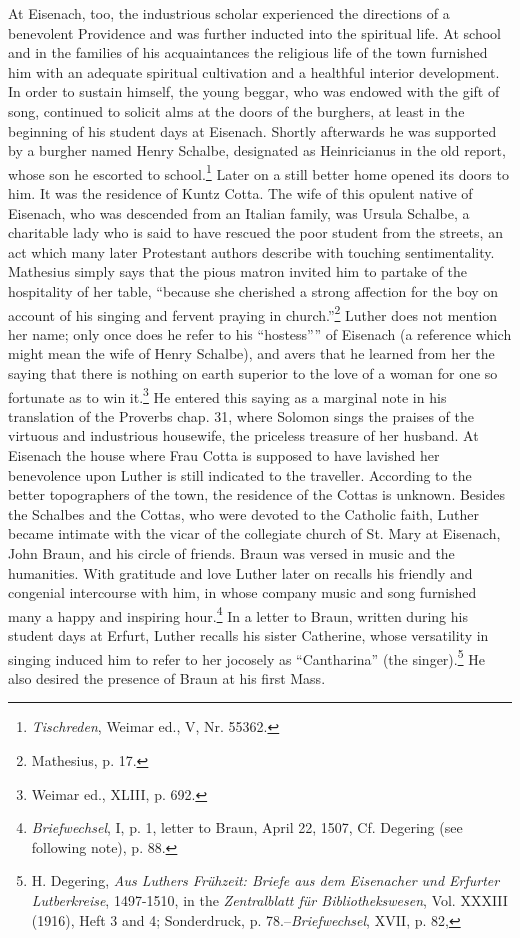 At Eisenach, too, the industrious scholar experienced the directions
of a benevolent Providence and was further inducted into the spiritual life. At school and in the families of his acquaintances the religious
life of the town furnished him with an adequate spiritual cultivation
and a healthful interior development. In order to sustain himself, the
young beggar, who was endowed with the gift of song, continued to
solicit alms at the doors of the burghers, at least in the beginning of
his student days at Eisenach. Shortly afterwards he was supported by
a burgher named Henry Schalbe, designated as Heinricianus in the
old report, whose son he escorted to school.\footnote{\textit{Tischreden}, Weimar ed., V, Nr. 55362.}
Later on a still better
home opened its doors to him. It was the residence of Kuntz Cotta.
The wife of this opulent native of Eisenach, who was descended from
an Italian family, was Ursula Schalbe, a charitable lady who is said
to have rescued the poor student from the streets, an act which many
later Protestant authors describe with touching sentimentality. Mathesius simply says that the pious matron invited him to partake of the
hospitality of her table, “because she cherished a strong affection for
the boy on account of his singing and fervent praying in church.”\footnote
{Mathesius, p. 17.}
Luther does not mention her name; only once does he refer to his
“hostess”” of Eisenach (a reference which might mean the wife of
Henry Schalbe), and avers that he learned from her the saying that
there is nothing on earth superior to the love of a woman for one so
fortunate as to win it.\footnote{Weimar ed., XLIII, p. 692.}
He entered this saying as a marginal note in
his translation of the Proverbs chap. 31, where Solomon sings the
praises of the virtuous and industrious housewife, the priceless treasure of her husband.
At Eisenach the house where Frau Cotta is supposed
to have lavished her benevolence upon Luther is still indicated
to the traveller. According to the better topographers of the town, the
residence of the Cottas is unknown.
Besides the Schalbes and the Cottas, who were devoted to the
Catholic faith, Luther became intimate with the vicar of the collegiate
church of St. Mary at Eisenach, John Braun, and his circle of friends.
Braun was versed in music and the humanities. With gratitude and
love Luther later on recalls his friendly and congenial intercourse with
him, in whose company music and song furnished many a happy and
inspiring hour.\footnote{\textit{Briefwechsel}, I, p. 1, letter to Braun, April 22, 1507, Cf. Degering (see following note), p. 88.}
In a letter to Braun, written during his student
days at Erfurt, Luther recalls his sister Catherine, whose versatility
in singing induced him to refer to her jocosely as “Cantharina”
(the singer).\footnote{H. Degering, \textit{Aus Luthers Frühzeit: Briefe aus dem Eisenacher und Erfurter Lutberkreise}, 1497-1510, in the \textit{Zentralblatt für Bibliothekswesen}, Vol. XXXIII (1916), Heft 3 and 4; Sonderdruck, p. 78.--\textit{Briefwechsel}, XVII, p. 82,}
He also desired the presence of Braun at his first Mass.

